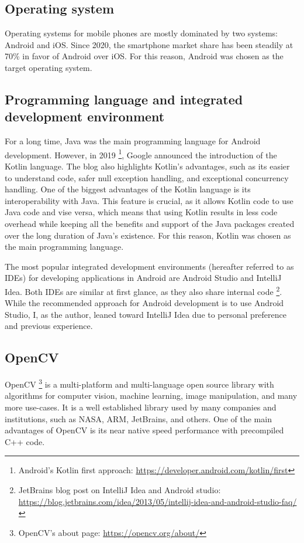 \subsection{Operating system}
Operating systems for mobile phones are mostly dominated by two systems: Android and iOS. Since 2020, the smartphone market share has been steadily at 70\% \cite{phoneOsStatistics} in favor of Android over iOS. For this reason, Android was chosen as the target operating system.

\subsection{Programming language and integrated development environment}
For a long time, Java was the main programming language for Android development. However, in 2019 \footnote{Android's Kotlin first approach: \url{https://developer.android.com/kotlin/first}}, Google announced the introduction of the Kotlin language. The blog also highlights Kotlin's advantages, such as its easier to understand code, safer null exception handling, and exceptional concurrency handling. One of the biggest advantages of the Kotlin language is its interoperability with Java. This feature is crucial, as it allows Kotlin code to use Java code and vise versa, which means that using Kotlin results in less code overhead while keeping all the benefits and support of the Java packages created over the long duration of Java's existence. For this reason, Kotlin was chosen as the main programming language.

The most popular integrated development environments (hereafter referred to as IDEs) for developing applications in Android are Android Studio and IntelliJ Idea. Both IDEs are similar at first glance, as they also share internal code \footnote{JetBrains blog post on IntelliJ Idea and Android studio: \url{https://blog.jetbrains.com/idea/2013/05/intellij-idea-and-android-studio-faq/}}. While the recommended approach for Android development is to use Android Studio, I, as the author, leaned toward IntelliJ Idea due to  personal preference and previous experience.

\subsection{OpenCV}
OpenCV \footnote{OpenCV's about page: \url{https://opencv.org/about/}} is a multi-platform and multi-language open source library with algorithms for computer vision, machine learning, image manipulation, and many more use-cases. It is a well established library used by many companies and institutions, such as NASA, ARM, JetBrains, and others. One of the main advantages of OpenCV is its near native speed performance with precompiled C++ code.

